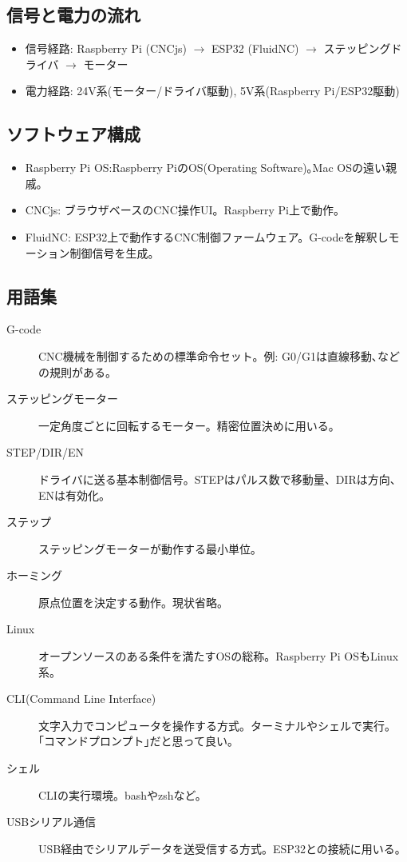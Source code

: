 \documentclass[uplatex,dvipdfmx]{ujarticle}
\begin{document}
\subsection{信号と電力の流れ}
\begin{itemize}
    \item 信号経路: Raspberry Pi (CNCjs) $\to$ ESP32 (FluidNC) $\to$ ステッピングドライバ $\to$ モーター
    \item 電力経路: 24V系(モーター/ドライバ駆動), 5V系(Raspberry Pi/ESP32駆動)
\end{itemize}

\subsection{ソフトウェア構成}
\begin{itemize}
    \item Raspberry Pi OS:Raspberry PiのOS(Operating Software)｡Mac OSの遠い親戚｡
    \item CNCjs: ブラウザベースのCNC操作UI。Raspberry Pi上で動作。
    \item FluidNC: ESP32上で動作するCNC制御ファームウェア。G-codeを解釈しモーション制御信号を生成。
\end{itemize}

\subsection{用語集}
\begin{description}
    \item[G-code] CNC機械を制御するための標準命令セット。例: G0/G1は直線移動､などの規則がある。
    \item[ステッピングモーター] 一定角度ごとに回転するモーター。精密位置決めに用いる。
    \item[STEP/DIR/EN] ドライバに送る基本制御信号。STEPはパルス数で移動量、DIRは方向、ENは有効化。
    \item[ステップ] ステッピングモーターが動作する最小単位｡
    \item[ホーミング] 原点位置を決定する動作。現状省略。
    \item[Linux] オープンソースのある条件を満たすOSの総称。Raspberry Pi OSもLinux系。
    \item[CLI(Command Line Interface)] 文字入力でコンピュータを操作する方式。ターミナルやシェルで実行。｢コマンドプロンプト｣だと思って良い｡
    \item[シェル] CLIの実行環境。bashやzshなど。
    \item[USBシリアル通信] USB経由でシリアルデータを送受信する方式。ESP32との接続に用いる。
\end{description}
\end{document}
